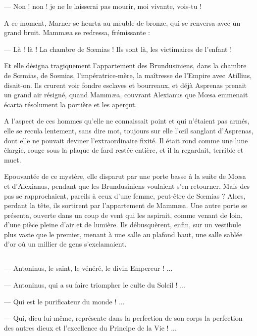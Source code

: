 \documentclass[a4paper, 11pt, oneside, polutonikogreek, french]{article}
\begin{document}
--- Non ! non ! je ne le laisserai pas mourir, moi vivante, vois-tu !

A ce moment, Marner se heurta au meuble de bronze, qui se renversa avec un grand bruit. Mammæa se redressa, frémissante :

--- Là ! là ! La chambre de Sœmias ! Ils sont là, les victimaires de l'enfant !

Et elle désigna tragiquement l'appartement des Brundusiniens, dans la chambre de Sœmias, de Sœmias, l'impératrice-mère, la maîtresse de l'Empire avec Atillius, disait-on. Ils crurent voir fondre esclaves et bourreaux, et déjà Asprenas prenait un grand air résigné, quand Mammæa, couvrant Alexianus que Mœsa emmenait écarta résolument la portière et les aperçut.

A l'aspect de ces hommes qu'elle ne connaissait point et qui n'étaient pas armés, elle se recula lentement, sans dire mot, toujours sur elle l'œil sanglant d'Asprenas, dont elle ne pouvait deviner l'extraordinaire fixité. Il était rond comme une lune élargie, rouge sous la plaque de fard restée entière, et il la regardait, terrible et muet.

Epouvantée de ce mystère, elle disparut par une porte basse à la suite de Mœsa et d'Alexianus, pendant que les Brundusiniens voulaient s'en retourner. Mais des pas se rapprochaient, pareils à ceux d'une femme, peut-être de Sœmias ? Alors, perdant la tête, ils sortirent par l'appartement de Mammæa. Une autre porte se présenta, ouverte dans un coup de vent qui les aspirait, comme venant de loin, d'une pièce pleine d'air et de lumière. Ils débusquèrent, enfin, sur un vestibule plus vaste que le premier, menant à une salle au plafond haut, une salle sablée d'or où un millier de gens s'exclamaient.
\clearpage
\subsection{}
\paragraph{}
--- Antoninus, le saint, le vénéré, le divin Empereur ! ...

--- Antoninus, qui a su faire triompher le culte du Soleil ! ...

--- Qui est le purificateur du monde ! ...

--- Qui, dieu lui-même, représente dans la perfection de son corps la perfection des autres dieux et l'excellence du Principe de la Vie ! ...
\end{document}
